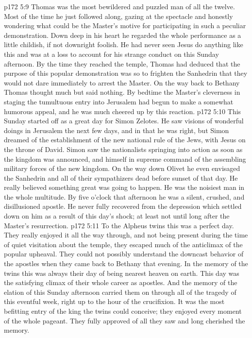 \pc \vs p172 5:9 Thomas was the most bewildered and puzzled man of all the twelve. Most of the time he just followed along, gazing at the spectacle and honestly wondering what could be the Master’s motive for participating in such a peculiar demonstration. Down deep in his heart he regarded the whole performance as a little childish, if not downright foolish. He had never seen Jesus do anything like this and was at a loss to account for his strange conduct on this Sunday afternoon. By the time they reached the temple, Thomas had deduced that the purpose of this popular demonstration was so to frighten the Sanhedrin that they would not dare immediately to arrest the Master. On the way back to Bethany Thomas thought much but said nothing. By bedtime the Master’s cleverness in staging the tumultuous entry into Jerusalem had begun to make a somewhat humorous appeal, and he was much cheered up by this reaction.
\vs p172 5:10 This Sunday started off as a great day for Simon Zelotes. He saw visions of wonderful doings in Jerusalem the next few days, and in that he was right, but Simon dreamed of the establishment of the new national rule of the Jews, with Jesus on the throne of David. Simon saw the nationalists springing into action as soon as the kingdom was announced, and himself in supreme command of the assembling military forces of the new kingdom. On the way down Olivet he even envisaged the Sanhedrin and all of their sympathizers dead before sunset of that day. He really believed something great was going to happen. He was the noisiest man in the whole multitude. By five o’clock that afternoon he was a silent, crushed, and disillusioned apostle. He never fully recovered from the depression which settled down on him as a result of this day’s shock; at least not until long after the Master’s resurrection.
\vs p172 5:11 To the Alpheus twins this was a perfect day. They really enjoyed it all the way through, and not being present during the time of quiet visitation about the temple, they escaped much of the anticlimax of the popular upheaval. They could not possibly understand the downcast behavior of the apostles when they came back to Bethany that evening. In the memory of the twins this was always their day of being nearest heaven on earth. This day was the satisfying climax of their whole career as apostles. And the memory of the elation of this Sunday afternoon carried them on through all of the tragedy of this eventful week, right up to the hour of the crucifixion. It was the most befitting entry of the king the twins could conceive; they enjoyed every moment of the whole pageant. They fully approved of all they saw and long cherished the memory.
